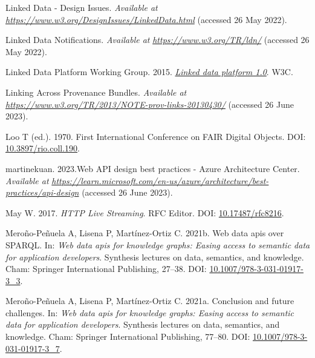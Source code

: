 \begin{CSLReferences}{1}{0}
\leavevmode{}%
Linked Data - Design Issues. \emph{Available at} \href{https://www.w3.org/DesignIssues/LinkedData.html}{\emph{https://www.w3.org/DesignIssues/LinkedData.html}} (accessed 26 May 2022).

\leavevmode{}%
Linked Data Notifications. \emph{Available at} \href{https://www.w3.org/TR/ldn/}{\emph{https://www.w3.org/TR/ldn/}} (accessed 26 May 2022).

\leavevmode{}%
Linked Data Platform Working Group. 2015. \emph{\href{https://www.w3.org/TR/2015/REC-ldp-20150226/}{Linked data platform 1.0}}. W3C.

\leavevmode{}%
Linking Across Provenance Bundles. \emph{Available at} \href{https://www.w3.org/TR/2013/NOTE-prov-links-20130430/}{\emph{https://www.w3.org/TR/2013/NOTE-prov-links-20130430/}} (accessed 26 June 2023).

\leavevmode{}%
Loo T (ed.). 1970. First International Conference on FAIR Digital Objects. DOI: \href{https://doi.org/10.3897/rio.coll.190}{10.3897/rio.coll.190}.

\leavevmode{}%
martinekuan. 2023.Web API design best practices - Azure Architecture Center. \emph{Available at} \href{https://learn.microsoft.com/en-us/azure/architecture/best-practices/api-design}{\emph{https://learn.microsoft.com/en-us/azure/architecture/best-practices/api-design}} (accessed 26 June 2023).

\leavevmode{}%
May W. 2017. \emph{HTTP Live Streaming}. RFC Editor. DOI: \href{https://doi.org/10.17487/rfc8216}{10.17487/rfc8216}.

\leavevmode{}%
Meroño-Peñuela A, Lisena P, Martínez-Ortiz C. 2021b. Web data apis over SPARQL. In: \emph{Web data apis for knowledge graphs: Easing access to semantic data for application developers}. Synthesis lectures on data, semantics, and knowledge. Cham: Springer International Publishing, 27--38. DOI: \href{https://doi.org/10.1007/978-3-031-01917-3_3}{10.1007/978-3-031-01917-3\_3}.

\leavevmode{}%
Meroño-Peñuela A, Lisena P, Martínez-Ortiz C. 2021a. Conclusion and future challenges. In: \emph{Web data apis for knowledge graphs: Easing access to semantic data for application developers}. Synthesis lectures on data, semantics, and knowledge. Cham: Springer International Publishing, 77--80. DOI: \href{https://doi.org/10.1007/978-3-031-01917-3_7}{10.1007/978-3-031-01917-3\_7}.


\end{CSLReferences}
